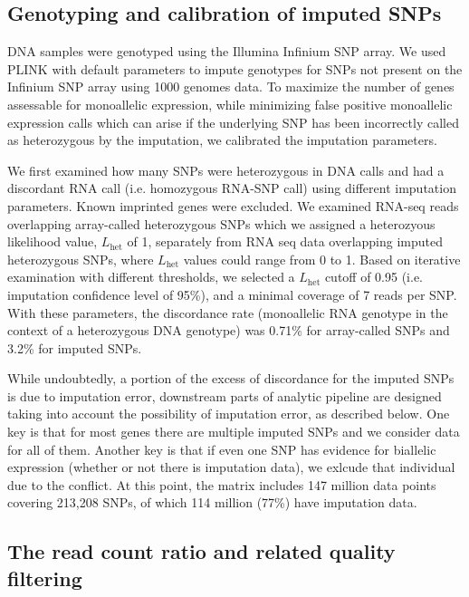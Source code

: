\documentclass[letterpaper]{article}
\begin{document}
\subsection{Genotyping and calibration of imputed SNPs}

DNA samples were genotyped using the Illumina Infinium SNP array. We used
PLINK with default parameters to impute genotypes for SNPs not present on the
Infinium SNP array using 1000 genomes data. To maximize the number of genes
assessable for monoallelic expression, while minimizing false positive
monoallelic expression calls which can arise if the underlying SNP has been
incorrectly called as heterozygous by the imputation, we calibrated the
imputation parameters.

We first examined how many SNPs were heterozygous in DNA calls and had a
discordant RNA call (i.e. homozygous RNA-SNP call) using different imputation
parameters. Known imprinted genes were excluded. We examined RNA-seq reads
overlapping array-called heterozygous SNPs which we assigned a heterozyous
likelihood value, \(L_\mathrm{het}\) of 1, separately from RNA seq data
overlapping imputed heterozygous SNPs, where \(L_\mathrm{het}\) values could
range from 0 to 1. Based on iterative examination with different thresholds,
we selected a \(L_\mathrm{het}\) cutoff of 0.95 (i.e. imputation confidence
level of 95\%), and a minimal coverage of 7 reads per SNP. With these
parameters, the discordance rate (monoallelic RNA genotype in the context of a
heterozygous DNA genotype) was 0.71\% for array-called SNPs and 3.2\% for
imputed SNPs.

While undoubtedly, a portion of the excess of discordance for the imputed SNPs
is due to imputation error, downstream parts of analytic pipeline are designed
taking into account the possibility of imputation error, as described below.
One key is that for most genes there are multiple imputed SNPs and we consider
data for all of them. Another key is that if even one SNP has evidence for
biallelic expression (whether or not there is imputation data), we exlcude
that individual due to the conflict. At this point, the matrix includes 147
million data points covering 213,208 SNPs, of which 114 million (77\%) have
imputation data.

\subsection{The read count ratio and related quality filtering}

\label{sec:filtering}
\end{document}
